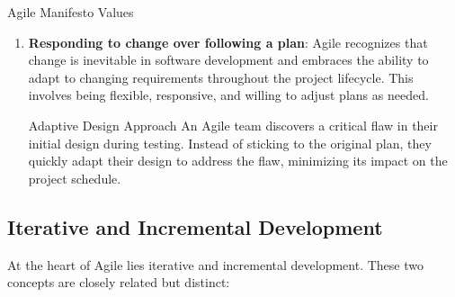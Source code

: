 \begin{conceptcard}{Agile Manifesto Values}
\begin{enumerate}
    \item \textbf{Responding to change over following a plan}: Agile recognizes that change is inevitable in software development and embraces the ability to adapt to changing requirements throughout the project lifecycle. This involves being flexible, responsive, and willing to adjust plans as needed.

          \begin{examplecard}{Adaptive Design Approach}
            An Agile team discovers a critical flaw in their initial design during testing. Instead of sticking to the original plan, they quickly adapt their design to address the flaw, minimizing its impact on the project schedule.
          \end{examplecard}
  \end{enumerate}
\end{conceptcard}

\subsection{Iterative and Incremental Development}

At the heart of Agile lies iterative and incremental development. These two
concepts are closely related but distinct:

